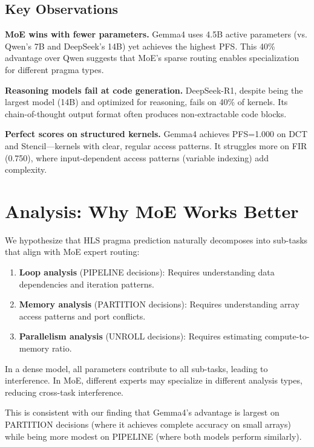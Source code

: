 \documentclass[11pt]{article}
\begin{document}
\subsection{Key Observations}

\textbf{MoE wins with fewer parameters.} Gemma4 uses 4.5B active
parameters (vs. Qwen's 7B and DeepSeek's 14B) yet achieves the
highest PFS. This 40\% advantage over Qwen suggests that MoE's
sparse routing enables specialization for different pragma types.

\textbf{Reasoning models fail at code generation.} DeepSeek-R1,
despite being the largest model (14B) and optimized for reasoning,
fails on 40\% of kernels. Its chain-of-thought output format
often produces non-extractable code blocks.

\textbf{Perfect scores on structured kernels.} Gemma4 achieves
PFS=1.000 on DCT and Stencil---kernels with clear, regular access
patterns. It struggles more on FIR (0.750), where input-dependent
access patterns (variable indexing) add complexity.

\section{Analysis: Why MoE Works Better}

We hypothesize that HLS pragma prediction naturally decomposes
into sub-tasks that align with MoE expert routing:

\begin{enumerate}
    \item \textbf{Loop analysis} (PIPELINE decisions): Requires
    understanding data dependencies and iteration patterns.
    \item \textbf{Memory analysis} (PARTITION decisions): Requires
    understanding array access patterns and port conflicts.
    \item \textbf{Parallelism analysis} (UNROLL decisions): Requires
    estimating compute-to-memory ratio.
\end{enumerate}

In a dense model, all parameters contribute to all sub-tasks,
leading to interference. In MoE, different experts may specialize
in different analysis types, reducing cross-task interference.

This is consistent with our finding that Gemma4's advantage is
largest on PARTITION decisions (where it achieves complete
accuracy on small arrays) while being more modest on PIPELINE
(where both models perform similarly).
\end{document}
